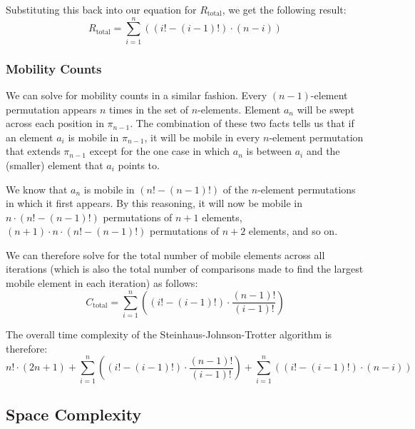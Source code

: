 \documentclass[10pt, oneside]{article}   	%
\begin{document}
Substituting this back into our equation for $R_{\text{total}}$, we get the following result:
\[
	R_{\text{total}} = \sum_{i = 1}^{n} \left( \left( i! - (i - 1)! \right) \cdot \left( n - i \right) \right)
\]

\subsubsection{Mobility Counts}

We can solve for mobility counts in a similar fashion. Every $(n - 1)$-element permutation appears $n$ times in the set of $n$-elements. Element $a_{n}$ will be swept across each position in $\pi_{n - 1}$. The combination of these two facts tells us that if an element $a_{i}$ is mobile in $\pi_{n - 1}$, it will be mobile in every $n$-element permutation that extends $\pi_{n - 1}$ except for the one case in which $a_{n}$ is between $a_{i}$ and the (smaller) element that $a_{i}$ points to.

We know that $a_{n}$ is mobile in $(n! - (n - 1)!)$ of the $n$-element permutations in which it first appears. By this reasoning, it will now be mobile in $n \cdot (n! - (n - 1)!)$ permutations of $n + 1$ elements, $(n + 1) \cdot n \cdot (n! - (n - 1)!)$ permutations of $n + 2$ elements, and so on.

We can therefore solve for the total number of mobile elements across all iterations (which is also the total number of comparisons made to find the largest mobile element in each iteration) as follows:
\[
	C_{\text{total}} = \sum_{i = 1}^{n} \left( \left( i! - (i - 1)! \right) \cdot \frac{(n - 1)!}{(i - 1)!} \right)
\]

The overall time complexity of the Steinhaus-Johnson-Trotter algorithm is therefore:
\[
	n! \cdot (2n + 1)+ \sum_{i = 1}^{n} \left( \left( i! - (i - 1)! \right) \cdot \frac{(n - 1)!}{(i - 1)!} \right) + \sum_{i = 1}^{n} \left( \left(i! - (i - 1)! \right) \cdot \left( n - i \right) \right) 
\]

\subsection{Space Complexity}
\end{document}
